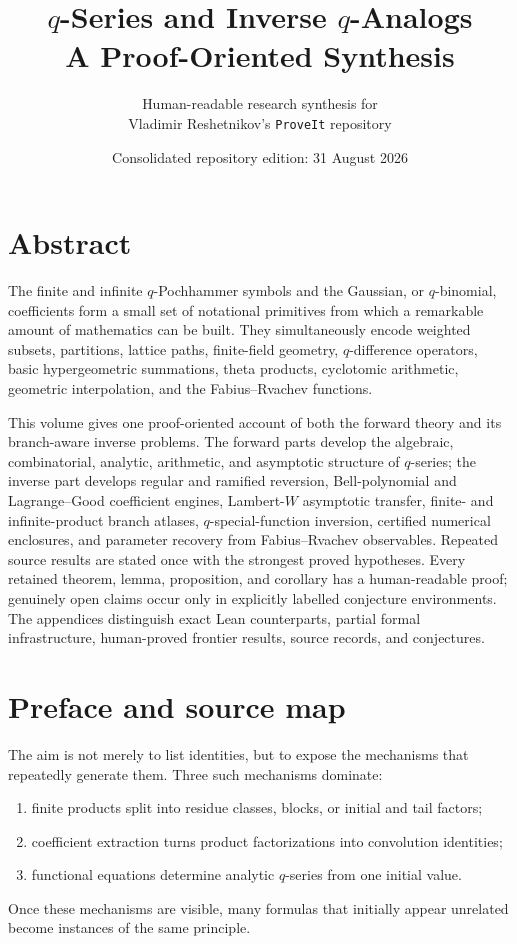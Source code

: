 \documentclass[11pt,a4paper,oneside,openany]{book}
\title{\Huge\bfseries $q$-Series and Inverse $q$-Analogs\\[8pt]
\Large A Proof-Oriented Synthesis}
\author{Human-readable research synthesis for\\
\small Vladimir Reshetnikov's \texttt{ProveIt} repository}
\date{Consolidated repository edition: 31 August 2026}
\theoremstyle{definition}
\theoremstyle{remark}
\begin{document}
\frontmatter
\hypersetup{pageanchor=false}
\maketitle
\hypersetup{pageanchor=true}

\chapter*{Abstract}
The finite and infinite $q$-Pochhammer symbols and the Gaussian, or
$q$-binomial, coefficients form a small set of notational primitives from
which a remarkable amount of mathematics can be built.  They simultaneously
encode weighted subsets, partitions, lattice paths, finite-field geometry,
$q$-difference operators, basic hypergeometric summations, theta products,
cyclotomic arithmetic, geometric interpolation, and the Fabius--Rvachev
functions.

This volume gives one proof-oriented account of both the forward theory and
its branch-aware inverse problems.  The forward parts develop the algebraic,
combinatorial, analytic, arithmetic, and asymptotic structure of $q$-series;
the inverse part develops regular and ramified reversion, Bell-polynomial and
Lagrange--Good coefficient engines, Lambert-$W$ asymptotic transfer,
finite- and infinite-product branch atlases, $q$-special-function inversion,
certified numerical enclosures, and parameter recovery from Fabius--Rvachev
observables.  Repeated source results are stated once with the strongest
proved hypotheses.  Every retained theorem, lemma, proposition, and corollary
has a human-readable proof; genuinely open claims occur only in explicitly
labelled conjecture environments.  The appendices distinguish exact Lean
counterparts, partial formal infrastructure, human-proved frontier results,
source records, and conjectures.

\chapter*{Preface and source map}
The aim is not merely to list identities, but to expose the mechanisms that repeatedly generate them.  Three such mechanisms dominate:
\begin{enumerate}
\item finite products split into residue classes, blocks, or initial and tail factors;
\item coefficient extraction turns product factorizations into convolution identities;
\item functional equations determine analytic $q$-series from one initial value.
\end{enumerate}
Once these mechanisms are visible, many formulas that initially appear unrelated become instances of the same principle.
\end{document}
